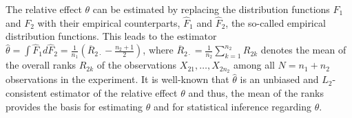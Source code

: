 The relative effect $\theta$ can be estimated by replacing the 
distribution functions $F_1$ and $F_2$ with their empirical counterparts, 
$\widehat{F}_1$ and $\widehat{F}_2$, the so-called empirical distribution 
functions. This leads to the estimator $\widehat{\theta} = \int \widehat{F}_1 d 
\widehat{F}_2 = \frac1{n_1} \left(\overline{R}_{2\cdot}-\frac{n_2+1}2 \right)$, 
where $\overline{R}_{2\cdot} = \frac1{n_2} \sum_{k=1}^{n_2} R_{2k}$ denotes the 
mean of the overall ranks $R_{2k}$ of the observations $X_{21}, \ldots, 
X_{2n_2}$ among all $N=n_1+n_2$ observations in the experiment. It is 
well-known that $\widehat{\theta}$ is an unbiased and $L_2$-consistent 
estimator  of the relative effect $\theta$ and thus, the mean of the ranks 
provides the basis for estimating $\theta$ and for statistical inference 
regarding $\theta$. 

